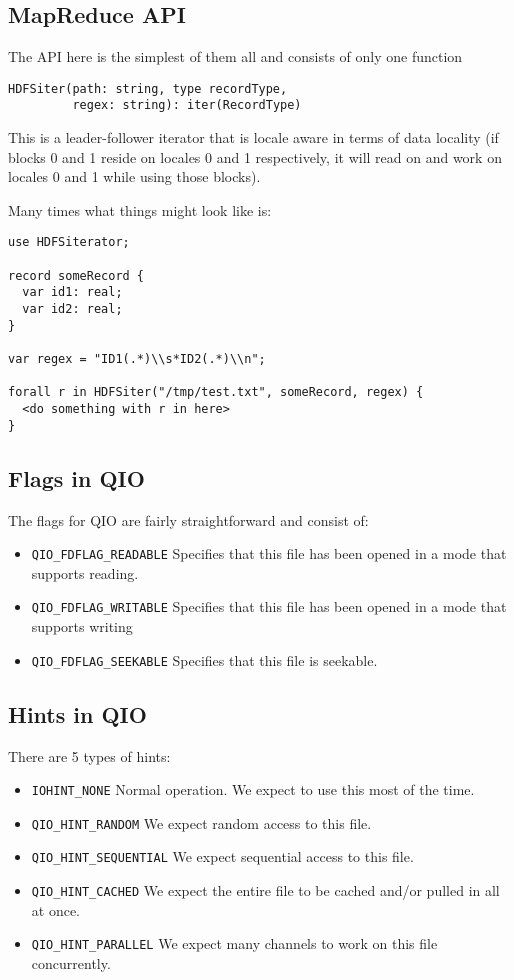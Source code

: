 \subsection{MapReduce API}
The API here is the simplest of them all and consists of only one function
\begin{lstlisting}
HDFSiter(path: string, type recordType,
         regex: string): iter(RecordType)
\end{lstlisting}
This is a leader-follower iterator that is locale aware in terms of data
locality (\eg  if blocks 0 and 1 reside on locales 0 and 1 respectively,
it will read on and work on locales 0 and 1 while using those blocks).

Many times what things might look like is:
\begin{lstlisting}
use HDFSiterator;

record someRecord {
  var id1: real;
  var id2: real;
}

var regex = "ID1(.*)\\s*ID2(.*)\\n";

forall r in HDFSiter("/tmp/test.txt", someRecord, regex) {
  <do something with r in here>
}
\end{lstlisting}

\subsection{Flags in QIO}\label{s:flags}
The flags for QIO are fairly straightforward and consist of:
\begin{itemize}
\item {\tt QIO\_FDFLAG\_READABLE} Specifies that this file has been opened in a mode that
supports reading. 
\item {\tt QIO\_FDFLAG\_WRITABLE} Specifies that this file has been opened in a mode that
supports writing
\item {\tt QIO\_FDFLAG\_SEEKABLE} Specifies that this file is seekable.
\end{itemize}

\subsection{Hints in QIO}\label{s:hints}
There are 5 types of hints:
\begin{itemize}
\item {\tt IOHINT\_NONE} Normal operation. We expect to use this most of the time.
\item {\tt QIO\_HINT\_RANDOM} We expect random access to this file.
\item {\tt QIO\_HINT\_SEQUENTIAL} We expect sequential access to this file.
\item {\tt QIO\_HINT\_CACHED} We expect the entire file to be cached and/or pulled in all
at once.
\item {\tt QIO\_HINT\_PARALLEL} We expect many channels to work on this file concurrently.
\end{itemize}
